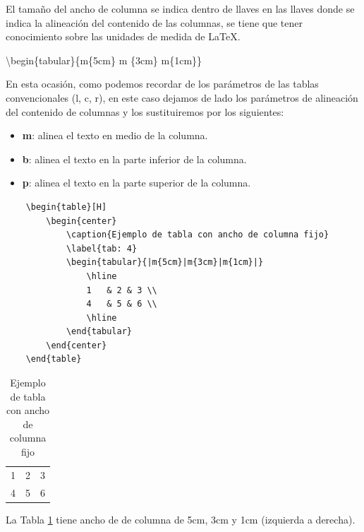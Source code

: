 El tamaño del ancho de columna se indica dentro de llaves en las llaves donde se indica la alineación del contenido de las columnas, se tiene que tener conocimiento sobre las unidades de medida de \LaTeX.
\begin{center}
    \textbackslash{begin\{tabular\}\{m\{5cm\} m \{3cm\} m\{1cm\}\}}
\end{center}
En esta ocasión, como podemos recordar de los parámetros de las tablas convencionales (l, c, r), en este caso dejamos de lado los parámetros de alineación del contenido de columnas y los sustituiremos por los siguientes:
\begin{itemize}
    \item \textbf{m}: alinea el texto en medio de la columna.
    \item \textbf{b}: alinea el texto en la parte inferior de la columna.
    \item \textbf{p}: alinea el texto en la parte superior de la columna.
\end{itemize}
\begin{lstlisting}
    \begin{table}[H]
        \begin{center}
            \caption{Ejemplo de tabla con ancho de columna fijo}
            \label{tab: 4}
            \begin{tabular}{|m{5cm}|m{3cm}|m{1cm}|}
                \hline
                1   & 2 & 3 \\
                4   & 5 & 6 \\
                \hline
            \end{tabular}
        \end{center}
    \end{table}
\end{lstlisting}
\begin{table}[H]
    \begin{center}
        \caption{Ejemplo de tabla con ancho de columna fijo}
        \label{tab: 4}
        \begin{tabular}{|m{5cm}|m{3cm}|m{1cm}|}
            \hline
            1   & 2 & 3 \\
            4   & 5 & 6 \\
            \hline
        \end{tabular}
    \end{center}
\end{table}

La Tabla \ref{tab: 4} tiene ancho de de columna de 5cm, 3cm y 1cm (izquierda a derecha).


